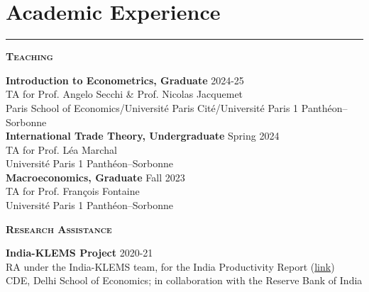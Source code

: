 \documentclass[11pt,a4paper]{article}
\begin{document}
\section*{Academic Experience}
\vspace{-0.5em}
\hrule
\vspace{0.5em}
\textbf{\large \textsc{Teaching}}
\vspace{-0.05cm}
\begin{adjustwidth}{1em}{0pt}
\textbf{Introduction to Econometrics, Graduate} \hfill 2024-25 \\
TA for Prof. Angelo Secchi \& Prof. Nicolas Jacquemet\\
Paris School of Economics/Université Paris Cité/Université Paris 1 Panthéon–Sorbonne
\vspace{1.2em}\\
\textbf{International Trade Theory, Undergraduate} \hfill Spring 2024\\
TA for Prof. Léa Marchal \\
Université Paris 1 Panthéon–Sorbonne
\vspace{1.2em}\\
\textbf{Macroeconomics, Graduate} \hfill Fall 2023\\
TA for Prof. François Fontaine \\
Université Paris 1 Panthéon–Sorbonne
\end{adjustwidth}
\vspace{0.5em}
\textbf{\large \textsc{Research Assistance}}
\vspace{-0.01cm}
\begin{adjustwidth}{1em}{0pt}
\textbf{India-KLEMS Project} \hfill 2020-21\\
RA under the India-KLEMS team, for the India Productivity Report (\href{https://rbi.org.in/Scripts/PublicationReportDetails.aspx?UrlPage=&ID=1217}{link})\\
CDE, Delhi School of Economics; in collaboration with the Reserve Bank of India
\end{adjustwidth}
\end{document}
